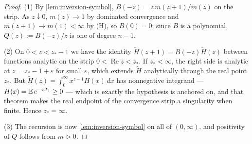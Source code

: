\begin{proof}
(1) By \ref{lem:inversion-symbol}, $B(-z) = z\,m(z+1)/m(z)$ on the strip. As $z \downarrow 0$,
$m(z) \to 1$ by dominated convergence and $m(z+1) \to m(1) < \infty$ by (H), so $B(0) = 0$;
since $B$ is a polynomial, $Q(z) := B(-z)/z$ is one of degree $n-1$.

(2) On $0 < z < z_* - 1$ we have the identity $\tilde H(z+1) = B(-z)\tilde H(z)$ between
functions analytic on the strip $0 < \operatorname{Re} z < z_*$. If $z_* < \infty$, the right
side is analytic at $z = z_* - 1 + \varepsilon$ for small $\varepsilon$, which extends
$\tilde H$ analytically through the real point $z_*$. But $\tilde H(z) = \int_0^\infty
x^{z-1}H(x)\,dx$ has nonnegative integrand --- $H(x) = \mathbb{E}\,e^{-xT_1} \ge 0$ --- which is
exactly the hypothesis  is anchored on, and that theorem makes the real endpoint of
the convergence strip a singularity when finite. Hence $z_* = \infty$.

(3) The recursion is now \ref{lem:inversion-symbol} on all of $(0,\infty)$, and positivity of
$Q$ follows from $m > 0$.
\end{proof}


